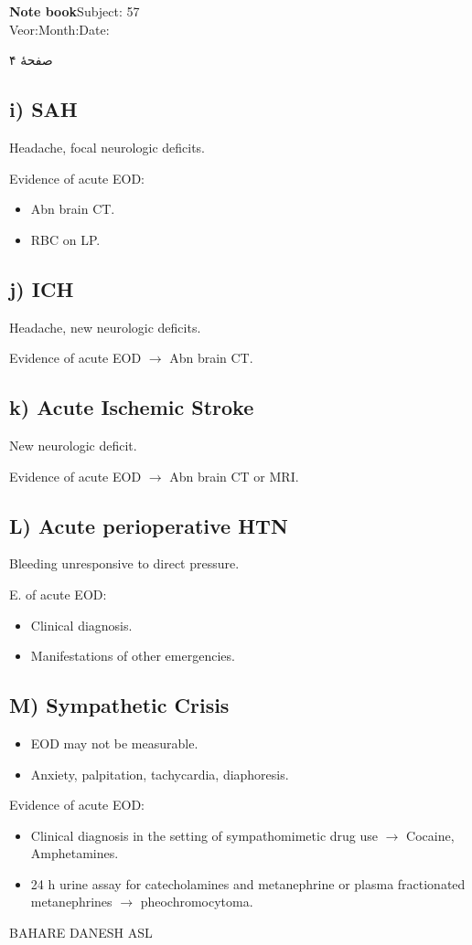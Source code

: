 \documentclass[12pt,a4paper]{article}
\newcommand{\SysHTNpage}[1]{\clearpage
  \begin{latin}\noindent\textbf{Note book}\hfill Subject: 57\\
  {\small Veor:\enspace\underline{\hspace{1cm}}\quad Month:\enspace\underline{\hspace{1cm}}\quad Date:\enspace\underline{\hspace{1cm}}}\end{latin}
  \noindent صفحهٔ #1\par\medskip}
\newcommand{\SysHTNfoot}{\par\medskip\begin{latin}\noindent\footnotesize BAHARE DANESH ASL\end{latin}}
\begin{document}
\SysHTNpage{۴}
\begin{latin}
\subsection*{i) SAH}
\noindent Headache, focal neurologic deficits.
\par Evidence of acute EOD:
\begin{itemize}
\item Abn brain CT.
\item RBC on LP.
\end{itemize}
\subsection*{j) ICH}
\noindent Headache, new neurologic deficits.
\par Evidence of acute EOD \(\longrightarrow\) Abn brain CT.
\subsection*{k) Acute Ischemic Stroke}
\noindent New neurologic deficit.
\par Evidence of acute EOD \(\longrightarrow\) Abn brain CT or MRI.
\subsection*{L) Acute perioperative HTN}
\noindent Bleeding unresponsive to direct pressure.
\par E. of acute EOD:
\begin{itemize}
\item Clinical diagnosis.
\item Manifestations of other emergencies.
\end{itemize}
\subsection*{M) Sympathetic Crisis}
\begin{itemize}
\item EOD may not be measurable.
\item Anxiety, palpitation, tachycardia, diaphoresis.
\end{itemize}
\noindent Evidence of acute EOD:
\begin{itemize}
\item Clinical diagnosis in the setting of sympathomimetic drug use \(\longrightarrow\) Cocaine, Amphetamines.
\item 24 h urine assay for catecholamines and metanephrine or plasma fractionated metanephrines \(\longrightarrow\) pheochromocytoma.
\end{itemize}
\end{latin}
\SysHTNfoot
\end{document}
